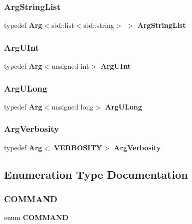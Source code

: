 \mbox{\label{Arg_8h_a64e1c2a2497384846973a505a06b8bf5}} 
\subsubsection{Arg\+String\+List}
{\footnotesize\ttfamily typedef \textbf{ Arg}$<$std\+::list$<$std\+::string$>$ $>$ \textbf{ Arg\+String\+List}}

\mbox{\label{Arg_8h_a0c069a3900a6e062343fee842801cda7}} 
\subsubsection{Arg\+U\+Int}
{\footnotesize\ttfamily typedef \textbf{ Arg}$<$unsigned int$>$ \textbf{ Arg\+U\+Int}}

\mbox{\label{Arg_8h_aac0b9261b13b2049ff3e5f8281dcf17a}} 
\subsubsection{Arg\+U\+Long}
{\footnotesize\ttfamily typedef \textbf{ Arg}$<$unsigned long$>$ \textbf{ Arg\+U\+Long}}

\mbox{\label{Arg_8h_ada399bd6f2e117a953bcdcaeee4f1620}} 
\subsubsection{Arg\+Verbosity}
{\footnotesize\ttfamily typedef \textbf{ Arg}$<$\textbf{ V\+E\+R\+B\+O\+S\+I\+TY}$>$ \textbf{ Arg\+Verbosity}}



\subsection{Enumeration Type Documentation}
\mbox{\label{Arg_8h_a0fbada5bff0eeb4dc6be4b6e6f1c4eaf}} 
\subsubsection{C\+O\+M\+M\+A\+ND}
{\footnotesize\ttfamily enum \textbf{ C\+O\+M\+M\+A\+ND}}

